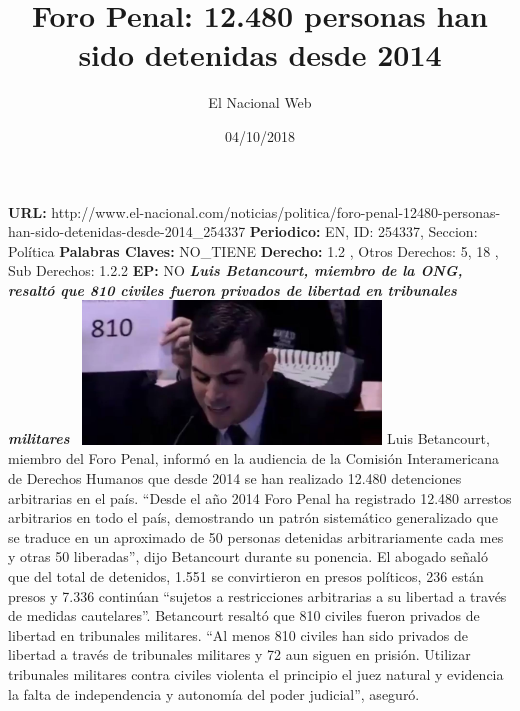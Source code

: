 \documentclass{article}%
\title{\textbf{Foro Penal: 12.480 personas han sido detenidas desde 2014}}%
\author{El Nacional Web}%
\date{04/10/2018}%
\begin{document}
%
\normalsize%
\maketitle%
\textbf{URL: }%
http://www.el{-}nacional.com/noticias/politica/foro{-}penal{-}12480{-}personas{-}han{-}sido{-}detenidas{-}desde{-}2014\_254337\newline%
%
\textbf{Periodico: }%
EN, %
ID: %
254337, %
Seccion: %
Política\newline%
%
\textbf{Palabras Claves: }%
NO\_TIENE\newline%
%
\textbf{Derecho: }%
1.2%
, Otros Derechos: %
5, 18%
, Sub Derechos: %
1.2.2%
\newline%
%
\textbf{EP: }%
NO\newline%
\newline%
%
\textbf{\textit{Luis Betancourt, miembro de la ONG, resaltó que 810 civiles fueron privados de libertad en tribunales militares~}}%
\newline%
\newline%
%
\includegraphics[width=300px]{161.jpg}%
\newline%
%
Luis Betancourt, miembro del Foro Penal, informó en la audiencia de la Comisión Interamericana de Derechos Humanos que desde 2014 se han realizado 12.480 detenciones arbitrarias en el país.%
\newline%
%
“Desde el año 2014 Foro Penal ha registrado 12.480 arrestos arbitrarios en todo el país, demostrando un patrón sistemático generalizado que se traduce en un aproximado de 50 personas detenidas arbitrariamente cada mes y otras 50 liberadas”, dijo Betancourt durante su ponencia.%
\newline%
%
El abogado señaló que del total de detenidos, 1.551 se convirtieron en presos políticos, 236 están presos y 7.336 continúan “sujetos a restricciones arbitrarias a su libertad a través de medidas cautelares”.%
\newline%
%
Betancourt resaltó que 810 civiles fueron privados de libertad en tribunales militares.%
\newline%
%
“Al menos 810 civiles han sido privados de libertad a través de tribunales militares y 72 aun siguen en prisión. Utilizar tribunales militares contra civiles violenta el principio el juez natural y evidencia la falta de independencia y autonomía del poder judicial”, aseguró.%
\newline%
%
\end{document}
